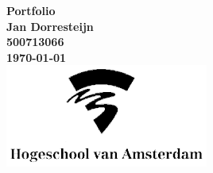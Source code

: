 \begin{titlepage}
	\centering
	\vfill
	{\bfseries\Huge
		Portfolio\\
		\vskip2cm
	}
	{\bfseries\Large
		Jan Dorresteijn\\
	}
	{
		\bfseries\normalsize
		500713066\\
		\vskip1cm
		\today\\
	}
	\vfill
	\includegraphics[width=0.5\textwidth]{images/hva-logo.eps}
	\vfill
	\vfill
\end{titlepage}
\newpage
